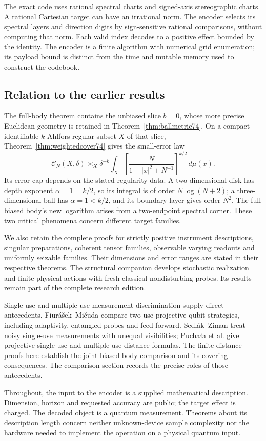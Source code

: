 The exact code uses rational spectral charts and signed-axis
stereographic charts. A rational Cartesian target can have an
irrational norm. The encoder selects its spectral layers and direction
digits by sign-sensitive rational comparisons, without computing
that norm. Each valid index decodes to a positive effect bounded by
the identity. The encoder is a finite algorithm with numerical grid
enumeration; its payload bound is distinct from the time and mutable
memory used to construct the codebook.

\subsection{Relation to the earlier results}
The full-body theorem contains the unbiased slice $b=0$, whose more
precise Euclidean geometry is retained in
Theorem~\ref{thm:ballmetric74}. On a compact identifiable
$k$-Ahlfors-regular subset $X$ of that slice,
Theorem~\ref{thm:weightedcover74} gives the small-error law
\[
 \mathcal C_N(X,\delta)\asymp_X
 \delta^{-k}\int_X
       \left[\frac{N}{1-|x|^2+N^{-1}}\right]^{k/2}\,d\mu(x).
\]
Its error cap depends on the stated regularity data. A two-dimensional
disk has depth exponent $\alpha=1=k/2$, so its integral is of order
$N\log(N+2)$; a three-dimensional ball has $\alpha=1<k/2$, and its
boundary layer gives order $N^2$. The full biased body's new logarithm
arises from a two-endpoint spectral corner. These two critical
phenomena concern different target families.

We also retain the complete proofs for strictly positive instrument
descriptions, singular preparations, coherent tensor families,
observable varying readouts and uniformly seizable families. Their
dimensions and error ranges are stated in their respective theorems.
The structural companion develops stochastic realization and finite
physical actions with fresh classical nondisturbing probes. Its
results remain part of the complete research edition.

Single-use and multiple-use measurement discrimination supply direct
antecedents. Fiur\'a\v sek--Mi\v cuda \cite{FM75} compare two-use
projective-qubit strategies, including adaptivity, entangled probes
and feed-forward. Sedl\'ak--Ziman \cite{SZ74} treat noisy single-use
measurements with unequal visibilities; Pucha\l a et al.
\cite{PPKK74,PPKKO72} give projective single-use and multiple-use
distance formulas. The finite-distance proofs here establish the
joint biased-body comparison and its covering consequences. The
comparison section records the precise roles of those antecedents.

Throughout, the input to the encoder is a supplied mathematical
description. Dimension, horizon and requested accuracy are public;
the target effect is charged. The decoded object is a quantum
measurement. Theorems about its description length concern neither
unknown-device sample complexity nor the hardware needed to implement
the operation on a physical quantum input.
